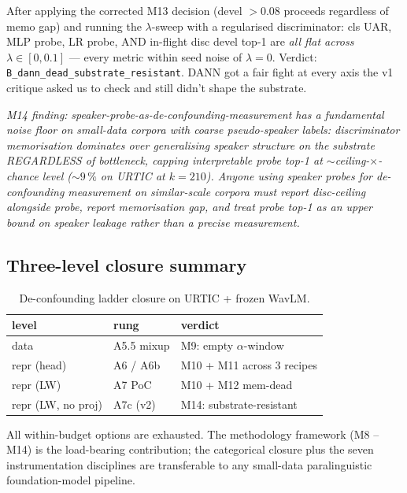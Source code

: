 After applying the corrected M13 decision (devel $> 0.08$ proceeds regardless of memo gap) and running the $\lambda$-sweep with a regularised discriminator: cls UAR, MLP probe, LR probe, AND in-flight disc devel top-1 are \emph{all flat across $\lambda \in [0, 0.1]$} --- every metric within seed noise of $\lambda{=}0$. Verdict: \texttt{B\_dann\_dead\_substrate\_resistant}. DANN got a fair fight at every axis the v1 critique asked us to check and still didn't shape the substrate.

\textit{M14 finding:} \emph{speaker-probe-as-de-confounding-measurement has a fundamental noise floor on small-data corpora with coarse pseudo-speaker labels: discriminator memorisation dominates over generalising speaker structure on the substrate REGARDLESS of bottleneck, capping interpretable probe top-1 at $\sim$ceiling-$\times$-chance level ($\sim 9\,\%$ on URTIC at $k{=}210$). Anyone using speaker probes for de-confounding measurement on similar-scale corpora must report disc-ceiling alongside probe, report memorisation gap, and treat probe top-1 as an upper bound on speaker leakage rather than a precise measurement.}

\subsection{Three-level closure summary}

\begin{table}[t]
\centering\small
\caption{De-confounding ladder closure on URTIC + frozen WavLM.}
\label{tab:closure}
\begin{tabular}{llp{3.0cm}}
\toprule
level & rung & verdict \\
\midrule
data         & A5.5 mixup        & M9: empty $\alpha$-window \\
repr (head)  & A6 / A6b          & M10 + M11 across 3 recipes \\
repr (LW)    & A7 PoC            & M10 + M12 mem-dead \\
repr (LW, no proj) & A7c (v2)    & M14: substrate-resistant \\
\bottomrule
\end{tabular}
\end{table}

All within-budget options are exhausted. The methodology framework (M8 -- M14) is the load-bearing contribution; the categorical closure plus the seven instrumentation disciplines are transferable to any small-data paralinguistic foundation-model pipeline.

